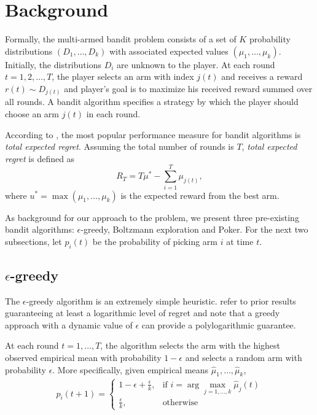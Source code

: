 \documentclass[12pt]{article}
\begin{document}
\section{Background}
Formally, the multi-armed bandit problem consists of a set of $K$ probability distributions
$(D_1, \ldots, D_k)$ with associated expected values $(\mu_1, \ldots, \mu_k)$.
Initially, the distributions $D_i$ are unknown to the player.  At each round $t = 1,2,\ldots,T$, the player selects an arm with index $j(t)$
and receives a reward $r(t) \sim D_{j(t)}$ and player's goal is to maximize his received reward summed over all rounds.  A bandit algorithm
specifies a strategy by which the player should choose an arm $j(t)$ in each round.

According to \cite{Kuleshov}, the most popular performance measure for bandit algorithms is \emph{total expected regret}.  Assuming the 
total number of rounds is $T$, \emph{total expected regret} is defined as
$$
R_T = T\mu^{*} - \sum_{i=1}^{T} \mu_{j(t)},
$$
where $u^{*} = \max(\mu_1, \ldots, \mu_k)$ is the expected reward from the best arm. 

As background for our approach to the problem, we present three pre-existing bandit algorithms: $\epsilon$-greedy, Boltzmann exploration and Poker.
For the next two subsections, let $p_i(t)$ be the probability of picking arm $i$ at time $t$.

\subsection{$\epsilon$-greedy}

The $\epsilon$-greedy algorithm is an extremely simple heuristic. \cite{Auer} refer to prior results guaranteeing at least a logarithmic level of regret and note that a greedy approach with a dynamic value of $\epsilon$ can provide a polylogarithmic guarantee.

At each round $t = 1, \ldots, T$, the algorithm selects the arm with the highest observed empirical mean with probability $1 - \epsilon$ and
selects a random arm with probability $\epsilon$.  More specifically, given empirical means $\hat{\mu}_1, \ldots, \hat{\mu}_k$,
\begin{align*}
p_i(t+1) = 
\begin{cases}
1 - \epsilon + \frac{\epsilon}{k}, & \textrm{if } i = \arg \max_{j = 1, \ldots, k} \hat{\mu}_j(t) \\
\frac{\epsilon}{k}, & \textrm{otherwise}
\end{cases}
\end{align*}
\end{document}
